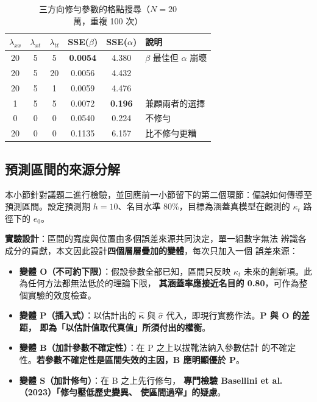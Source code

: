 \documentclass[UTF8, fontset=macnew, a4paper, 12pt]{ctexart}
\begin{document}
\begin{table}[H]
\centering
\caption{三方向修勻參數的格點搜尋（$N=20$ 萬，重複 100 次）}
\small
\begin{tabular}{ccccc l}
\toprule
$\lambda_{xx}$ & $\lambda_{xt}$ & $\lambda_{tt}$ & SSE($\beta$) & SSE($\alpha$) & 說明\\
\midrule
20 & 5 & 5  & \textbf{0.0054} & 4.380 & $\beta$ 最佳但 $\alpha$ 崩壞\\
20 & 5 & 20 & 0.0056 & 4.432 & \\
20 & 5 & 1  & 0.0059 & 4.476 & \\
1  & 5 & 5  & 0.0072 & \textbf{0.196} & 兼顧兩者的選擇\\
0  & 0 & 0  & 0.0540 & 0.224 & 不修勻\\
20 & 0 & 0  & 0.1135 & 6.157 & 比不修勻更糟\\
\bottomrule
\end{tabular}
\label{tab:lam3}
\end{table}

\subsection{預測區間的來源分解}

本小節針對議題二進行檢驗，並回應前一小節留下的第二個環節：偏誤如何傳導至
預測區間。設定預測期 $h=10$、名目水準 80\%，目標為涵蓋真模型在觀測的
$\kappa_t$ 路徑下的 $e_0$。

\textbf{實驗設計}：區間的寬度與位置由多個誤差來源共同決定，單一組數字無法
辨識各成分的貢獻，本文因此設計\textbf{四個層層疊加的變體}，每次只加入一個
誤差來源：

\begin{itemize}
  \item \textbf{變體 O（不可約下限）}：假設參數全部已知，區間只反映
        $\kappa_t$ 未來的創新項。此為任何方法都無法低於的理論下限，
        \textbf{其涵蓋率應接近名目的 0.80}，可作為整個實驗的效度檢查。
  \item \textbf{變體 P（插入式）}：以估計出的 $\hat{\boldsymbol{\kappa}}$
        與 $\hat\sigma$ 代入，即現行實務作法。\textbf{P 與 O 的差距，
        即為「以估計值取代真值」所須付出的權衡}。
  \item \textbf{變體 B（加計參數不確定性）}：在 P 之上以拔靴法納入參數估計
        的不確定性。\textbf{若參數不確定性是區間失效的主因，B 應明顯優於 P}。
  \item \textbf{變體 S（加計修勻）}：在 B 之上先行修勻，
        \textbf{專門檢驗 Basellini et al.（2023）「修勻壓低歷史變異、
        使區間過窄」的疑慮}。
\end{itemize}
\end{document}
